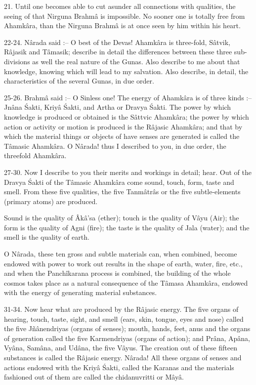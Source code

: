 21. Until one becomes able to cut asunder all connections with qualities, the seeing of that Nirguna Brahm\^a is impossible. No sooner one is totally free from Ahamk\^ara, than the Nirguna Brahm\^a is at once seen by him within his heart.

22-24. N\^arada said :-- O best of the Devas! Ahamk\^ara is three-fold, S\^atvik, R\^ajasik and T\^amasik; describe in detail the differences between these three sub-divisions as well the real nature of the Gunas. Also describe to me about that knowledge, knowing which will lead to my salvation. Also describe, in detail, the characteristics of the several Gunas, in due order.

25-26. Brahm\^a said :-- O Sinless one! The energy of Ahamk\^ara is of three kinds :-- Jn\^ana \'Sakti, Kriy\^a \'Sakti, and Artha or Dravya \'Sakti. The power by which knowledge is produced or obtained is the S\^attvic Ahamk\^ara; the power by which action or activity or motion is produced is the R\^ajasic Ahamk\^ara; and that by which the material things or objects of have senses are generated is called the T\^amasic Ahamk\^ara. O N\^arada! thus I described to you, in due order, the threefold Ahamk\^ara.

27-30. Now I describe to you their merits and workings in detail; hear. Out of the Dravya \'Sakti of the T\^amasic Ahamk\^ara come sound, touch, form, taste and smell. From these five qualities, the five Tanm\^atr\^as or the five subtle-elements (primary atoms) are produced.

Sound is the quality of Âk\^a'sa (ether); touch is the quality of V\^ayu (Air); the form is the quality of Agni (fire); the taste is the quality of Jala (water); and the smell is the quality of earth.

O N\^arada, these ten gross and subtle materials can, when combined, become endowed with power to work out results in the shape of earth, water, fire, etc., and when the Panch\^ikarana process is combined, the building of the whole cosmos takes place as a natural consequence of the T\^amasa Ahamk\^ara, endowed with the energy of generating material substances.

31-34. Now hear what are produced by the R\^ajasic energy. The five organs of hearing, touch, taste, sight, and smell (ears, skin, tongue, eyes and nose) called the five J\~n\^anendriyas (organs of senses); mouth, hands, feet, anus and the organs of generation called the five Karmendriyas (organs of action); and Pr\^ana, Ap\^ana, Vy\^ana, Sam\^ana, and Ud\^ana, the five V\^ayus. The creation out of these fifteen substances is called the R\^ajasic energy. N\^arada! All these organs of senses and actions endowed with the Kriy\^a \'Sakti, called the Karanas and the materials fashioned out of them are called the chidanuvritti or M\^ay\^a.

